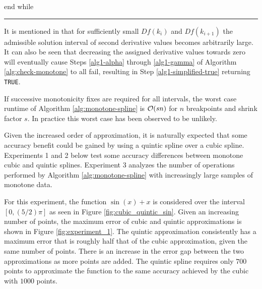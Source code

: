     \newline {}
    \newline {}
      end while
\vskip 2mm
\hrule
\vskip 3mm


It is mentioned in \cite{ulrich1994positivity} that for sufficiently small $Df(k_i)$ and $Df(k_{i+1})$ the admissible solution interval of second derivative values becomes arbitrarily large. It can also be seen that decreasing the assigned derivative values towards zero will eventually cause Steps \ref{alg1-alpha} through \ref{alg1-gamma} of Algorithm \ref{alg:check-monotone} to all fail, resulting in Step \ref{alg1-simplified-true} returning {\tt TRUE}.

If successive monotonicity fixes are required for all intervals, the worst case runtime of Algorithm \ref{alg:monotone-spline} is ${\cal O}(s n)$ for $n$ breakpoints and shrink factor $s$. In practice this worst case has been observed to be unlikely.


Given the increased order of approximation, it is naturally expected that some accuracy benefit could be gained by using a quintic spline over a cubic spline. Experiments 1 and 2 below test some accuracy differences between monotone cubic and quintic splines. Experiment 3 analyzes the number of operations performed by Algorithm \ref{alg:monotone-spline} with increasingly large samples of monotone data.


For this experiment, the function $\sin(x) + x$ is considered over the interval $[0,(5/2)\pi]$ as seen in Figure \ref{fig:cubic_quintic_sin}. Given an increasing number of points, the maximum error of cubic and quintic approximations is shown in Figure \ref{fig:experiment_1}. The quintic approximation consistently has a maximum error that is roughly half that of the cubic approximation, given the same number of points. There is an increase in the error gap between the two approximations as more points are added. The quintic spline requires only $700$ points to approximate the function to the same accuracy achieved by the cubic with $1000$ points.

